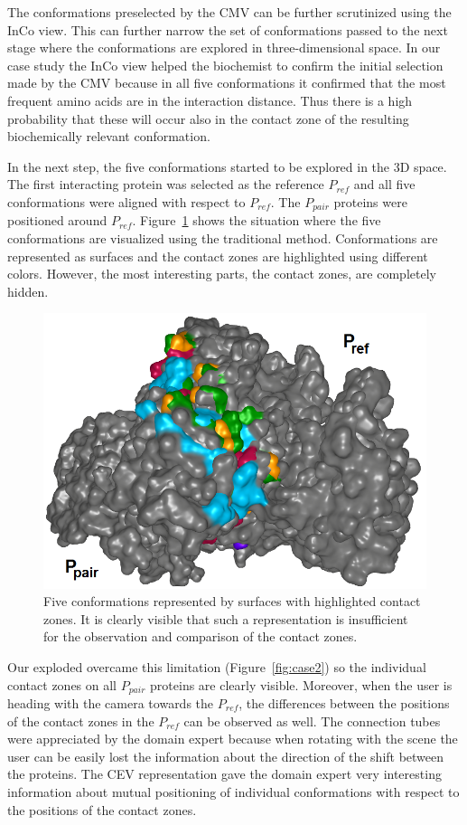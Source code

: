\documentclass[journal]{vgtc}                %
\begin{document}
The conformations preselected by the CMV can be further scrutinized using the InCo view.
This can further narrow the set of conformations passed to the next stage where the conformations are explored in three-dimensional space. 
In our case study the InCo view helped the biochemist to confirm the initial selection made by the CMV because in all five conformations it confirmed that the most frequent amino acids are in the interaction distance.
Thus there is a high probability that these will occur also in the contact zone of the resulting biochemically relevant conformation.

In the next step, the five conformations started to be explored in the 3D space.
The first interacting protein was selected as the reference $P_{ref}$ and all five conformations were aligned with respect to $P_{ref}$.
The $P_{pair}$ proteins were positioned around $P_{ref}$.
Figure~\ref{fig:case1} shows the situation where the five conformations are visualized using the traditional method.
Conformations are represented as surfaces and the contact zones are highlighted using different colors.
However, the most interesting parts, the contact zones, are completely hidden.

\begin{figure}[bt]
  \centering
  \includegraphics[width=0.7\columnwidth]{case1.png}
  \caption{Five conformations represented by surfaces with highlighted contact zones. It is clearly visible that such a representation is insufficient for the observation and comparison of the contact zones.}
  \label{fig:case1}
\end{figure}

Our exploded overcame this limitation (Figure~\ref{fig:case2}) so the individual contact zones on all $P_{pair}$ proteins are clearly visible.
Moreover, when the user is heading with the camera towards the $P_{ref}$, the differences between the positions of the contact zones in the $P_{ref}$ can be observed as well.
The connection tubes were appreciated by the domain expert because when rotating with the scene the user can be easily lost the information about the direction of the shift between the proteins.
The CEV representation gave the domain expert very interesting information about mutual positioning of individual conformations with respect to the positions of the contact zones.
\end{document}
